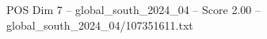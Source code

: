 \begin{textsample}{POS Dim 7 – global\_south\_2024\_04 – Score 2.00 – global\_south\_2024\_04/107351611.txt}
\end{textsample}
